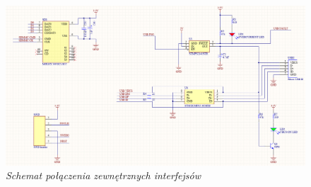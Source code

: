 \documentclass[eng,printmode]{mgr}
\begin{document}
\begin{figure}[!h]
    \centering
    \includegraphics[width=\textwidth]{schematics/conn.png}
    \caption{\textit{Schemat połączenia zewnętrznych interfejsów}}
\end{figure}
\end{document}
